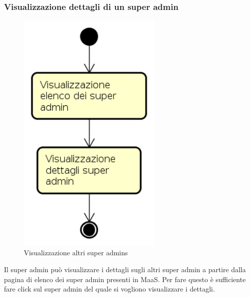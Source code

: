 \subsubsection{Visualizzazione dettagli di un super admin}
\begin{figure}[H]
\begin{center}
\includegraphics[height=12cm]{res/sections/backend/activities/visualizzazioneDettagliSuperAdminSA.png}
\caption{Visualizzazione altri super admins}
\end{center}
\end{figure}
Il super admin può visualizzare i dettagli sugli altri super admin a partire dalla pagina di elenco dei super admin presenti in MaaS. Per fare questo è sufficiente fare click sul super admin del quale si vogliono visualizzare i dettagli.